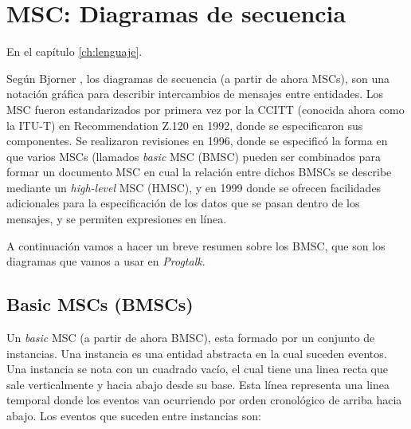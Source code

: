 \documentclass[12pt,a4paper]{report}
\begin{document}
\chapter{MSC: Diagramas de secuencia}

En el capítulo \ref{ch:lenguaje}.

Según Bjorner \cite{Bjorner}, los diagramas de secuencia (a partir de ahora MSCs), son una notación gráfica para describir intercambios de mensajes entre entidades. Los MSC fueron estandarizados por primera vez por la CCITT (conocida ahora como la ITU-T) en Recommendation Z.120 en 1992, donde se especificaron sus componentes. Se realizaron revisiones en 1996, donde se especificó la forma en que varios MSCs (llamados \textit{basic} MSC (BMSC) pueden ser combinados para formar un documento MSC en cual la relación entre dichos BMSCs se describe mediante un \textit{high-level} MSC (HMSC), y en 1999 donde se ofrecen facilidades adicionales para la especificación de los datos que se pasan dentro de los mensajes, y se permiten expresiones en línea.

A continuación vamos a hacer un breve resumen sobre los BMSC, que son los diagramas que vamos a usar en \textit{Progtalk}.

\section{Basic MSCs (BMSCs)}
Un \textit{basic} MSC (a partir de ahora BMSC), esta formado por un conjunto de instancias. Una instancia es una entidad abstracta en la cual suceden eventos. Una instancia se nota con un cuadrado vacío, el cual tiene una linea recta que sale verticalmente y hacia abajo desde su base. Esta línea representa una linea temporal donde los eventos van ocurriendo por orden cronológico de arriba hacia abajo. Los eventos que suceden entre instancias son:
\end{document}
